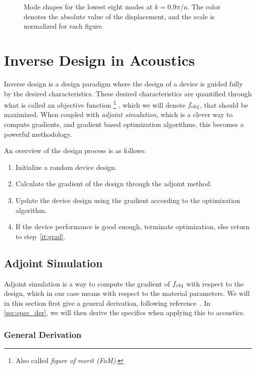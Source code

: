 \begin{figure}[htpb]
	\caption{%
		Mode shapes for the lowest eight modes at $k=0.9 \pi / a$.
		The color denotes the absolute value of the displacement,
		and the scale is normalized for each figure.
	}%
	\label{fig:modeshapes}
\end{figure}

\chapter{Inverse Design in Acoustics}

Inverse design is a design paradigm where the design of a device is guided fully by
the desired characteristics.
These desired characteristics are quantified through what is called an objective
function%
\footnote{Also called \emph{figure of merit (FoM)}.}%
, which we will denote $f_\text{obj}$,
that should be maximized.
When coupled with \emph{adjoint simulation}, which is a clever way to compute
gradients, and gradient based optimization
algorithms, this becomes a powerful methodology.

An overview of the design process is as follows:
\begin{enumerate}
	\item Initialize a random device design.
	\item\label{it:grad} Calculate the gradient of the design through the adjoint method.
	\item Update the device design using the gradient according to the optimization algorithm.
	\item If the device performance is good enough, terminate optimization, else
		return to step~\ref{it:grad}.
\end{enumerate}

\section{Adjoint Simulation}

Adjoint simulation is a way to compute the gradient of $f_\text{obj}$ with respect to
the design, which in our case means with respect to the material parameters.
We will in this section first give a general derivation, following
reference~\cite{giles_introduction_2000}.
In \cref{sec:spec_der}, we will then derive the specifics when applying this to
acoustics.

\subsection{General Derivation}\label{sec:general_derivation}

